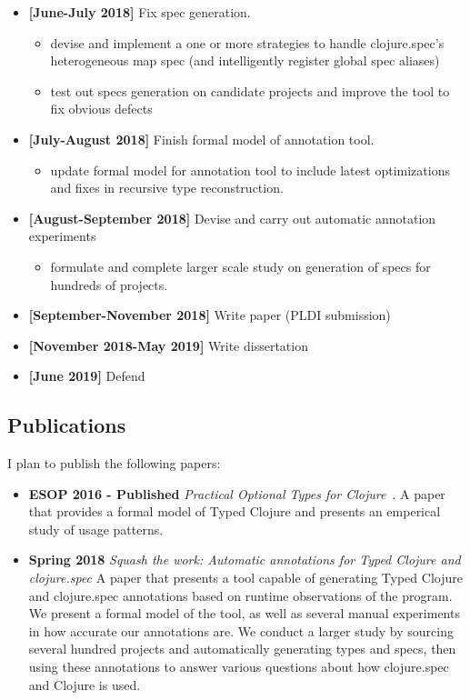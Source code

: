 \documentclass[9pt]{extarticle}
\begin{document}
\begin{itemize}
  \item \textbf{[June-July 2018]} Fix spec generation.
    \begin{itemize}
      \item devise and implement a one or more strategies to handle clojure.spec's
        heterogeneous map spec (and intelligently register global spec aliases)
      \item test out specs generation on candidate projects and improve the tool to fix obvious
        defects
    \end{itemize}
  \item \textbf{[July-August 2018]} Finish formal model of annotation tool.
    \begin{itemize}
      \item update formal model for annotation tool to include latest
        optimizations and fixes in recursive type reconstruction.
    \end{itemize}
  \item \textbf{[August-September 2018]} Devise and carry out automatic annotation experiments
    \begin{itemize}
      \item formulate and complete larger scale study on generation of specs for hundreds of projects.
    \end{itemize}
  \item \textbf{[September-November 2018]} Write paper (PLDI submission)
  \item \textbf{[November 2018-May 2019]} Write dissertation
  \item \textbf{[June 2019]} Defend
\end{itemize}

\subsection{Publications}

I plan to publish the following papers:

\begin{itemize}
  \item \textbf{ESOP 2016 - Published} \emph{Practical Optional Types for Clojure}~\cite{bonnaire2016practical}.
    A paper that provides a formal model of Typed Clojure and presents an emperical
    study of usage patterns.
  \item \textbf{Spring 2018} \emph{Squash the work: Automatic annotations for Typed Clojure and clojure.spec}
    A paper that presents a tool capable of generating Typed Clojure and clojure.spec
    annotations based on runtime observations of the program.
    We present a formal model of the tool, as well as several manual experiments in how
    accurate our annotations are.
    We conduct a larger study by sourcing several hundred projects and automatically
    generating types and specs, then using these annotations to answer various questions
    about how clojure.spec and Clojure is used.
\end{itemize}


\printbibliography
\end{document}
